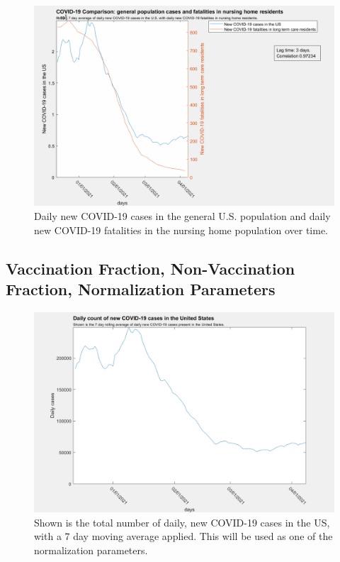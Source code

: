 \documentclass[twoside]{article}
\begin{document}
\begin{multicols}{2}
\begin{figure}[H]
	\includegraphics[width=\linewidth]{images/usaCases_nursingFatalities-3lag.png}
	\caption{Daily new COVID-19 cases in the general U.S. population and daily new COVID-19 fatalities in the nursing home population over time.}
	\label{fig:images/usaCases_nursingFatalities-3lagLabel}
\end{figure}

\subsection{Vaccination Fraction, Non-Vaccination Fraction, Normalization Parameters}

\begin{figure}[H]
	\includegraphics[width=\linewidth]{images/usa_daily_cases_processed.png}
	\caption{Shown is the total number of daily, new COVID-19 cases in the US, with a 7 day moving average applied. This will be used as one of the normalization parameters.}
	\label{fig:images/usa_daily_cases_processedLabel}
\end{figure}


\end{multicols}
\end{document}
